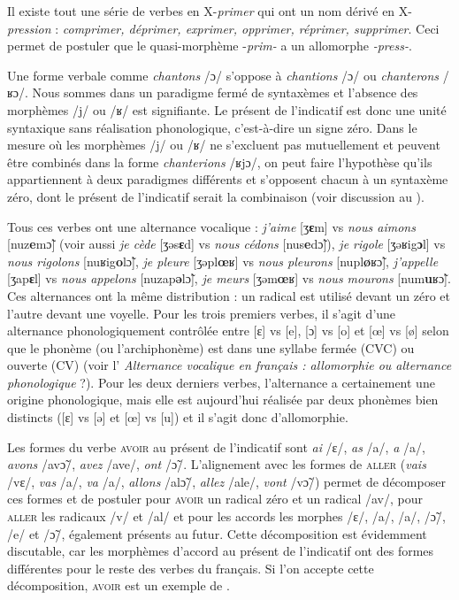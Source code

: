{     Il existe tout une série de verbes en X-\textit{primer} qui ont un nom dérivé en X-\textit{pression} : \textit{comprimer, déprimer, exprimer, opprimer, réprimer, supprimer}. Ceci permet de postuler que le quasi-morphème -\textit{prim-} a un allomorphe \textit{{}-press-}.

     Une forme verbale comme \textit{chantons} /ɔ/ s’oppose à \textit{chantions} /ɔ/ ou \textit{chanterons} /ʁɔ/. Nous sommes dans un paradigme fermé de syntaxèmes et l’absence des morphèmes /j/ ou /ʁ/ est signifiante. Le présent de l’indicatif est donc une unité syntaxique sans réalisation phonologique, c’est-à-dire un signe zéro. Dans le mesure où les morphèmes  /j/ ou /ʁ/ ne s'excluent pas mutuellement et peuvent être combinés dans la forme \textit{chanterions} /ʁjɔ/, on peut faire l'hypothèse qu'ils appartiennent à deux paradigmes différents et s'opposent chacun à un syntaxème zéro, dont le présent de l'indicatif serait la combinaison (voir discussion au ).

     Tous ces verbes ont une alternance vocalique : \textit{j’aime} [ʒ\textbf{ɛ}m] vs \textit{nous aimons} [nuz\textbf{e}m\~{ɔ}] (voir aussi \textit{je cède} [ʒǝs\textbf{ɛ}d] vs \textit{nous cédons} [nus\textbf{e}d\~{ɔ}]), \textit{je rigole} [ʒǝʁig\textbf{ɔ}l] vs \textit{nous rigolons} [nuʁig\textbf{o}l\~{ɔ}], \textit{je pleure} [ʒǝpl\textbf{œ}ʁ] vs \textit{nous pleurons} [nupl\textbf{ø}ʁ\~{ɔ}], \textit{j’appelle} [ʒap\textbf{ɛ}l] vs \textit{nous appelons} [nuzap\textbf{ǝ}l\~{ɔ}], \textit{je meurs} [ʒǝm\textbf{œ}ʁ] vs \textit{nous mourons} [num\textbf{u}ʁ\~{ɔ}]. Ces alternances ont la même distribution : un radical est utilisé devant un zéro et l’autre devant une voyelle. Pour les trois premiers verbes, il s’agit d’une alternance phonologiquement contrôlée entre [ɛ] vs [e], [ɔ] vs [o] et [œ] vs [ø] selon que le phonème (ou l’archiphonème) est dans une syllabe fermée (CVC) ou ouverte (CV) (voir l’ \textit{Alternance vocalique en français : allomorphie ou alternance phonologique} ?). Pour les deux derniers verbes, l’alternance a certainement une origine phonologique, mais elle est aujourd’hui réalisée par deux phonèmes bien distincts ([ɛ] vs [ǝ] et [œ] vs [u]) et il s’agit donc d’allomorphie.
    
      Les formes du verbe \textsc{avoir} au présent de l'indicatif sont \textit{ai} /ɛ/,  \textit{as} /a/, \textit{a} /a/, \textit{avons} /av\~{ɔ}/, \textit{avez} /ave/, \textit{ont} /\~{ɔ}/. L'alignement avec les formes de \textsc{aller} (\textit{vais} /vɛ/, \textit{vas} /a/, \textit{va} /a/, \textit{allons} /al\~{ɔ}/, \textit{allez} /ale/, \textit{vont} /v\~{ɔ}/) permet de décomposer ces formes et de postuler pour \textsc{avoir} un radical zéro et un radical /av/, pour \textsc{aller} les radicaux /v/ et /al/ et pour les accords les morphes /ɛ/, /a/, /a/, /\~{ɔ}/, /e/ et /\~{ɔ}/, également présents au futur. Cette décomposition est évidemment discutable, car les morphèmes d'accord au présent de l'indicatif ont des formes différentes pour le reste des verbes du français. Si l'on accepte cette décomposition, \textsc{avoir} est un exemple de .
}
